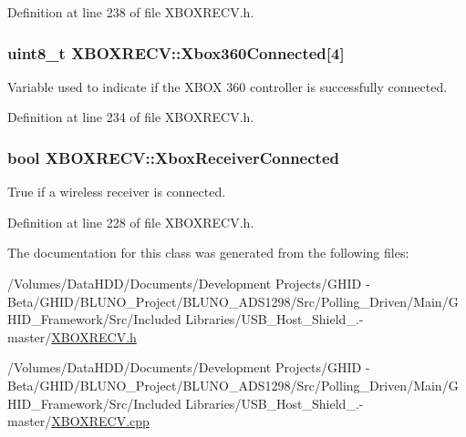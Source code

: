 \-Definition at line 238 of file \-X\-B\-O\-X\-R\-E\-C\-V.\-h.

\hypertarget{class_x_b_o_x_r_e_c_v_ac07faada38e159f1e7831d90863ebe3a}{
\subsubsection[{\-Xbox360\-Connected}]{\setlength{\rightskip}{0pt plus 5cm}uint8\-\_\-t {\bf \-X\-B\-O\-X\-R\-E\-C\-V\-::\-Xbox360\-Connected}\mbox{[}4\mbox{]}}}\label{class_x_b_o_x_r_e_c_v_ac07faada38e159f1e7831d90863ebe3a}
\-Variable used to indicate if the \-X\-B\-O\-X 360 controller is successfully connected. 

\-Definition at line 234 of file \-X\-B\-O\-X\-R\-E\-C\-V.\-h.

\hypertarget{class_x_b_o_x_r_e_c_v_a5ff16bba78f05af3023f395a342b625c}{
\subsubsection[{\-Xbox\-Receiver\-Connected}]{\setlength{\rightskip}{0pt plus 5cm}bool {\bf \-X\-B\-O\-X\-R\-E\-C\-V\-::\-Xbox\-Receiver\-Connected}}}\label{class_x_b_o_x_r_e_c_v_a5ff16bba78f05af3023f395a342b625c}
\-True if a wireless receiver is connected. 

\-Definition at line 228 of file \-X\-B\-O\-X\-R\-E\-C\-V.\-h.



\-The documentation for this class was generated from the following files\-:\begin{DoxyCompactItemize}
\item 
/\-Volumes/\-Data\-H\-D\-D/\-Documents/\-Development Projects/\-G\-H\-I\-D -\/ Beta/\-G\-H\-I\-D/\-B\-L\-U\-N\-O\-\_\-\-Project/\-B\-L\-U\-N\-O\-\_\-\-A\-D\-S1298/\-Src/\-Polling\-\_\-\-Driven/\-Main/\-G\-H\-I\-D\-\_\-\-Framework/\-Src/\-Included Libraries/\-U\-S\-B\-\_\-\-Host\-\_\-\-Shield\-\_.-\/master/\hyperlink{_x_b_o_x_r_e_c_v_8h}{\-X\-B\-O\-X\-R\-E\-C\-V.\-h}\item 
/\-Volumes/\-Data\-H\-D\-D/\-Documents/\-Development Projects/\-G\-H\-I\-D -\/ Beta/\-G\-H\-I\-D/\-B\-L\-U\-N\-O\-\_\-\-Project/\-B\-L\-U\-N\-O\-\_\-\-A\-D\-S1298/\-Src/\-Polling\-\_\-\-Driven/\-Main/\-G\-H\-I\-D\-\_\-\-Framework/\-Src/\-Included Libraries/\-U\-S\-B\-\_\-\-Host\-\_\-\-Shield\-\_.-\/master/\hyperlink{_x_b_o_x_r_e_c_v_8cpp}{\-X\-B\-O\-X\-R\-E\-C\-V.\-cpp}\end{DoxyCompactItemize}
